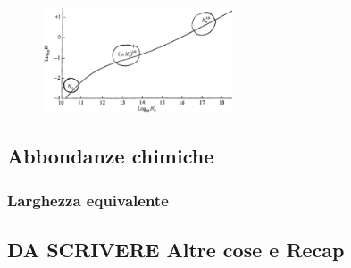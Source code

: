 \begin{figure}
    \centering
    \includegraphics[width=0.5\textwidth]{immagini/curva-crescita.png}
    \caption{}
    \label{fig:curva-crescita}
\end{figure}

\subsection{Abbondanze chimiche}


\subsubsection{Larghezza equivalente}

\subsection{DA SCRIVERE Altre cose e Recap}